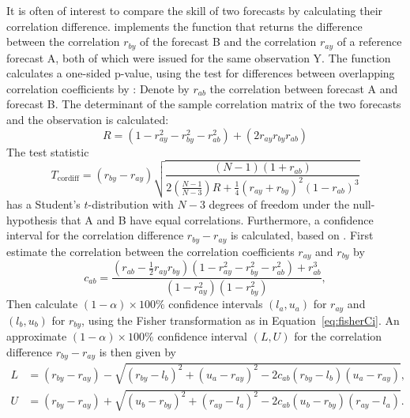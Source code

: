 \documentclass[article]{jss}\usepackage{graphicx, color}
\begin{document}
It is often of interest to compare the skill of two forecasts by calculating their correlation difference.
 implements the function  that returns the difference between the correlation $r_{by}$ of the forecast B and the correlation $r_{ay}$ of a reference forecast A, both of which were issued for the same observation Y.
The function calculates a one-sided p-value, using the test for differences between overlapping correlation coefficients by \citet{steiger1980tests}:
Denote by $r_{ab}$ the correlation between forecast A and forecast B.
The determinant of the sample correlation matrix of the two forecasts and the observation is calculated:
%
\begin{equation}
R  = (1 - r_{ay}^2 - r_{by}^2 - r_{ab}^2) + (2 r_{ay} r_{by} r_{ab})
\end{equation}
%
The test statistic
%
\begin{equation}
T_{\text{cordiff}}  = (r_{by} - r_{ay}) \sqrt{\frac{(N-1)(1+r_{ab})}{2\left(\frac{N-1}{N-3}\right) R+\frac{1}{4}(r_{ay}+r_{by})^2 (1-r_{ab})^3}}\label{eq:T2}
\end{equation}
%
has a Student's $t$-distribution with $N-3$ degrees of freedom under the null-hypothesis that A and B have equal correlations.
Furthermore, a confidence interval for the correlation difference $r_{by}-r_{ay}$ is calculated, based on \citet{zou2007toward}.
First estimate the correlation between the correlation coefficients $r_{ay}$ and $r_{by}$ by
%
\begin{equation}
c_{ab} = \frac{\left(r_{ab} - \frac{1}{2}  r_{ay}  r_{by}\right)  \left(1 - r_{ay}^2 - r_{by}^2 - r_{ab}^2\right) + r_{ab}^3}{(1-r_{ay}^2)(1-r_{by}^2)},
\end{equation}
%
Then calculate $(1-\alpha)\times 100\%$ confidence intervals $(l_a, u_a)$ for $r_{ay}$ and $(l_b, u_b)$ for $r_{by}$, using the Fisher transformation as in Equation~\ref{eq:fisherCi}.
An approximate $(1-\alpha)\times 100\%$ confidence interval $(L,U)$ for the correlation difference $r_{by} - r_{ay}$ is then given by
%
\begin{align}
L & = (r_{by} - r_{ay}) - \sqrt{(r_{by} - l_b)^2 + (u_a-r_{ay})^2 - 2  c_{ab}  (r_{by} - l_b) 
(u_a - r_{ay})},\nonumber\\
U & =  (r_{by} - r_{ay}) + \sqrt{(u_{b} - r_{by})^2 + (r_{ay}-l_a)^2 - 2 c_{ab} (u_b-r_{by})(r_{ay}-l_a)}.\label{eq:zou}
\end{align}
\end{document}
